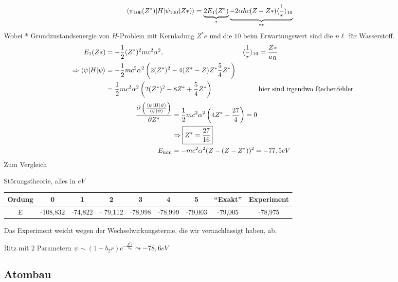 	\begin{align*}
		\braket{\psi_{100}(Z^*) | H | \psi_{100}(Z*)} 
		&= \underbrace{2E_1(Z^*)}_{\mathclap{*}} 
		\underbrace{- 2 \alpha \hbar c (Z - Z*) \erw{\frac{1}{r}}_{10}}_{\mathclap{**}}
	\end{align*}
Wobei * Grundzustandsenergie von $H$-Problem mit Kernladung $Z^* e$ und die $10$ beim Erwartungswert sind die $n \ell$ für Wasserstoff.
	\begin{align*}
		E_1(Z*) &= - \frac{1}{2} (Z^*)^2 m c^2 \alpha^2 ,&
		\langle {\frac{1}{r}} \rangle_{10} &= \frac{Z*}{a_B} \\
		\Rightarrow \braket{\psi | H | \psi} &= 
		-\frac{1}{2} m c^2 \alpha^2 
		\left( 2 (Z^*)^2 - 4 (Z^* - Z)Z^* \frac{5}{4} Z^* \right)\\
		&= \frac{1}{2} m c^2 \alpha^2 
		\left( 2 (Z^*)^2 - 8Z^* + \frac{5}{4} Z^* \right) & &\text{hier sind irgendwo Rechenfehler}
	\end{align*}
	\begin{align*}
		\frac{\partial \left(
			\frac{\braket{\psi | H | \psi}}{\braket{\psi | \psi}}
			\right)}{\partial Z^*}
		&= \frac{1}{2} m c^2 \alpha^2 \left( 4 Z^* - \frac{27}{4} \right) = 0 \\
		& \Rightarrow \boxed{Z^* = \frac{27}{16}} \\
		E_{\text{min}} &= - m c^2 \alpha^2 (Z- (Z - Z^*))^2 = -77,5eV
	\end{align*}
Zum Vergleich 

Störungstheorie, alles in $eV$ \\
	\begin{tabular}{c | c | c | c | c | c | c | c | c}
		Ordung & 0 & 1 & 2 & 3 & 4 & 5 & ``Exakt'' & Experiment \\
		\hline
		E & -108,832 & -74,822 & - 79,112 & -78,998 & -78,999 & -79,003 & -79,005 & -78,975
	\end{tabular}
Das Experiment weicht wegen der Wechselwirkungsterme, die wir vernachlässigt haben, ab.
	
	Ritz mit 2 Parametern $\psi \sim (1 + b_2 r) e^{-\frac{Z^* r}{a_B}} \leadsto -78,6eV$

\subsection{Atombau}

